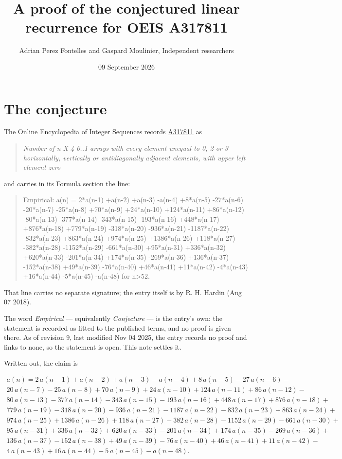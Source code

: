 \documentclass[11pt]{article}
\title{A proof of the conjectured linear recurrence for OEIS A317811}
\author{Adrian Perez Fontelles and Gaspard Moulinier, Independent researchers}
\date{09 September 2026}
\theoremstyle{definition}
\begin{document}
\maketitle
\section{The conjecture}

The Online Encyclopedia of Integer Sequences records \href{https://oeis.org/A317811}{A317811} as

\begin{quote}\itshape Number of n X 4 0..1 arrays with every element unequal to 0, 2 or 3 horizontally, vertically or antidiagonally adjacent elements, with upper left element zero\end{quote}

and carries in its Formula section the line:

\begin{quote}\ttfamily Empirical: a(n) = 2*a(n-1) +a(n-2) +a(n-3) -a(n-4) +8*a(n-5) -27*a(n-6) -20*a(n-7) -25*a(n-8) +70*a(n-9) +24*a(n-10) +124*a(n-11) +86*a(n-12) -80*a(n-13) -377*a(n-14) -343*a(n-15) -193*a(n-16) +448*a(n-17) +876*a(n-18) +779*a(n-19) -318*a(n-20) -936*a(n-21) -1187*a(n-22) -832*a(n-23) +863*a(n-24) +974*a(n-25) +1386*a(n-26) +118*a(n-27) -382*a(n-28) -1152*a(n-29) -661*a(n-30) +95*a(n-31) +336*a(n-32) +620*a(n-33) -201*a(n-34) +174*a(n-35) -269*a(n-36) +136*a(n-37) -152*a(n-38) +49*a(n-39) -76*a(n-40) +46*a(n-41) +11*a(n-42) -4*a(n-43) +16*a(n-44) -5*a(n-45) -a(n-48) for n>52.\end{quote}

That line carries no separate signature; the entry itself is by R. H. Hardin (Aug 07 2018).

The word {\itshape Empirical} --- equivalently {\itshape Conjecture} --- is the entry's own: the statement is recorded as fitted to the published terms, and no proof is given there. As of revision 9, last modified Nov 04 2025, the entry records no proof and links to none, so the statement is open. This note settles it.

Written out, the claim is

\begin{multline*} a(n) = 2\,a(n-1) + a(n-2) + a(n-3) - a(n-4) + 8\,a(n-5) - 27\,a(n-6) - \\ 20\,a(n-7) - 25\,a(n-8) + 70\,a(n-9) + 24\,a(n-10) + 124\,a(n-11) + 86\,a(n-12) - \\ 80\,a(n-13) - 377\,a(n-14) - 343\,a(n-15) - 193\,a(n-16) + 448\,a(n-17) + 876\,a(n-18) + \\ 779\,a(n-19) - 318\,a(n-20) - 936\,a(n-21) - 1187\,a(n-22) - 832\,a(n-23) + 863\,a(n-24) + \\ 974\,a(n-25) + 1386\,a(n-26) + 118\,a(n-27) - 382\,a(n-28) - 1152\,a(n-29) - 661\,a(n-30) + \\ 95\,a(n-31) + 336\,a(n-32) + 620\,a(n-33) - 201\,a(n-34) + 174\,a(n-35) - 269\,a(n-36) + \\ 136\,a(n-37) - 152\,a(n-38) + 49\,a(n-39) - 76\,a(n-40) + 46\,a(n-41) + 11\,a(n-42) - \\ 4\,a(n-43) + 16\,a(n-44) - 5\,a(n-45) - a(n-48). \end{multline*}
\end{document}
